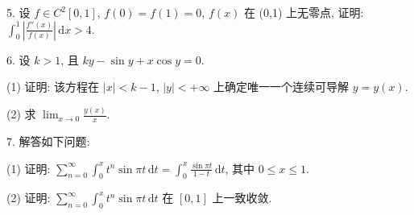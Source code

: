 \documentclass{examcollection}
\begin{document}
{\begin{minipage}{\textwidth}
5. 设 $f \in C^2[0,1]$, $f(0) = f(1) = 0$, $f(x)$ 在 (0,1) 上无零点, 证明: $\int_0^1 \left| \frac{f''(x)}{f(x)} \right| \, \mathrm{d}x > 4$.\par
6. 设 $k > 1$, 且 $ky - \sin y + x \cos y = 0$.\par
(1) 证明: 该方程在 $|x| < k - 1$, $|y| < +\infty$ 上确定唯一一个连续可导解 $y = y(x)$.\par
(2) 求 $\lim_{x\to 0}\frac{y(x)}{x}$.\par
7. 解答如下问题:\par
(1) 证明: $\sum_{n=0}^{\infty} \int_{0}^{x} t^{n} \sin \pi t \, \mathrm{d}t = \int_{0}^{x} \frac{\sin \pi t}{1 - t} \, \mathrm{d}t$, 其中 $0 \leq x \leq 1$.\par
(2) 证明: $\sum_{n=0}^{\infty} \int_{0}^{x} t^{n} \sin \pi t \, \mathrm{d}t$ 在 $[0,1]$ 上一致收敛.\par
\end{minipage}}
\ifdim\dimexpr\ht\proofbox+\dp\proofbox\relax>\textheight
\noindent\resizebox{!}{\textheight}{\usebox{\proofbox}}\else\noindent\usebox{\proofbox}\fi\clearpage
\end{document}
